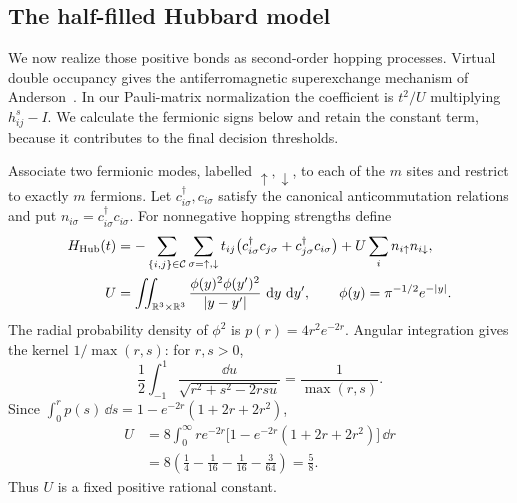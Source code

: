 \subsection{The half-filled Hubbard model}

We now realize those positive bonds as second-order hopping processes.
Virtual double occupancy gives the antiferromagnetic superexchange
mechanism of Anderson~\cite{Anderson1959}. In our Pauli-matrix
normalization the coefficient is $t^2/U$ multiplying
$h^s_{ij}-I$. We calculate the fermionic signs below and retain the
constant term, because it contributes to the final decision thresholds.

Associate two fermionic modes, labelled $\uparrow,\downarrow$, to each
of the $m$ sites and restrict to exactly $m$ fermions.  Let
$c_{i\sigma}^\dagger,c_{i\sigma}$ satisfy the canonical
anticommutation relations and put
$n_{i\sigma}=c_{i\sigma}^\dagger c_{i\sigma}$.
For nonnegative hopping strengths define
\begin{equation}\label{eq:hubbard-definition}
 \begin{split}
 H_{\rm Hub}(t)
   &=-\sum_{\{i,j\}\in\mathcal C}\sum_{\sigma=\uparrow,\downarrow}
       t_{ij}\bigl(c_{i\sigma}^\dagger c_{j\sigma}
                  +c_{j\sigma}^\dagger c_{i\sigma}\bigr)
       +U\sum_i n_{i\uparrow}n_{i\downarrow},\\
 U&=\iint_{\mathbb R^3\times\mathbb R^3}
       \frac{\phi(y)^2\phi(y')^2}{|y-y'|}\,\,\mathrm d y\,\,\mathrm d y',
       \qquad \phi(y)=\pi^{-1/2}e^{-|y|}.
 \end{split}
\end{equation}
The radial probability density of $\phi^2$ is $p(r)=4r^2e^{-2r}$.
Angular integration gives the kernel $1/\max(r,s)$: for $r,s>0$,
\[
 \frac12\int_{-1}^{1}\frac{\dd u}{\sqrt{r^2+s^2-2rsu}}
      =\frac1{\max(r,s)}.
\]
Since $\int_0^r p(s)\,\dd s=1-e^{-2r}(1+2r+2r^2)$,
\begin{equation}\label{eq:onsite-integral}
 \begin{split}
 U&=8\int_0^\infty r e^{-2r}
           \bigl[1-e^{-2r}(1+2r+2r^2)\bigr]\,\dd r\\
  &=8\left(\frac14-\frac1{16}-\frac1{16}-\frac3{64}\right)
    =\frac58.
 \end{split}
\end{equation}
Thus $U$ is a fixed positive rational constant.

